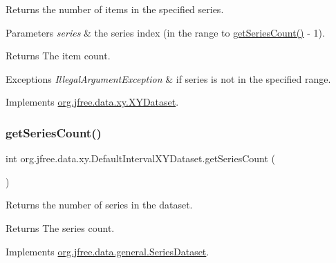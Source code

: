 Returns the number of items in the specified series.


\begin{DoxyParams}{Parameters}
{\em series} & the series index (in the range {} to {\ttfamily \mbox{\hyperlink{classorg_1_1jfree_1_1data_1_1xy_1_1_default_interval_x_y_dataset_a11470bfa9b540c971123d4282c0f5a8a}{get\+Series\+Count()}} -\/ 1}).\\
\hline
\end{DoxyParams}
\begin{DoxyReturn}{Returns}
The item count.
\end{DoxyReturn}

\begin{DoxyExceptions}{Exceptions}
{\em Illegal\+Argument\+Exception} & if {\ttfamily series} is not in the specified range. \\
\hline
\end{DoxyExceptions}


Implements \mbox{\hyperlink{interfaceorg_1_1jfree_1_1data_1_1xy_1_1_x_y_dataset_ae81f9de91dfcae45028fc8a486a119da}{org.\+jfree.\+data.\+xy.\+X\+Y\+Dataset}}.

\mbox{\label{classorg_1_1jfree_1_1data_1_1xy_1_1_default_interval_x_y_dataset_a11470bfa9b540c971123d4282c0f5a8a}} 
\subsubsection{\texorpdfstring{get\+Series\+Count()}{getSeriesCount()}}
{\footnotesize\ttfamily int org.\+jfree.\+data.\+xy.\+Default\+Interval\+X\+Y\+Dataset.\+get\+Series\+Count (\begin{DoxyParamCaption}{ }\end{DoxyParamCaption})}

Returns the number of series in the dataset.

\begin{DoxyReturn}{Returns}
The series count. 
\end{DoxyReturn}


Implements \mbox{\hyperlink{interfaceorg_1_1jfree_1_1data_1_1general_1_1_series_dataset_a84fe822f5918f941d9de1ed1b73c9f58}{org.\+jfree.\+data.\+general.\+Series\+Dataset}}.

